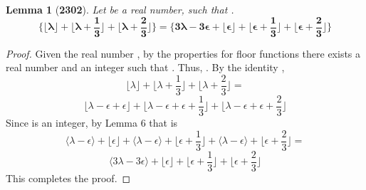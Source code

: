 \documentclass[preview]{standalone}
\newtheorem{lemma}{Lemma}
\begin{document}
\begin{lemma}[\textbf{2302}]
    Let \bm{$\lambda$} be a real number, 
    such that \bm{$\big \lfloor \lambda \big \rfloor + \epsilon = \lambda$}.
    \begin{equation*}
        \bm{
            \Bigg\{
                \bigg \lfloor \lambda \bigg \rfloor 
                    + 
                \bigg \lfloor \lambda + \frac{1}{3} \bigg \rfloor 
                    + 
                \bigg \lfloor \lambda + \frac{2}{3} \bigg \rfloor
            \Bigg\}
                =
            \Bigg\{
                3 \lambda - 3 \epsilon 
                    +
                \bigg \lfloor \epsilon \bigg \rfloor 
                    +
                \bigg \lfloor \epsilon + \frac{1}{3} \bigg \rfloor
                    +
                \bigg \lfloor \epsilon + \frac{2}{3} \bigg \rfloor            
            \Bigg\}
        }
    \end{equation*}
\end{lemma}

\begin{proof}
    Given the real number \bm{$\lambda$}, 
    by the properties for floor functions
    there exists a real number \bm{$\epsilon$}
    and an integer \bm{$\lambda - \epsilon$} such that 
    \bm{$\lfloor \lambda \rfloor = \lambda - \epsilon$}.
    Thus, \bm{$\lambda = \lambda - \epsilon + \epsilon$}.
    By the identity \bm{$\lambda$},
    \begin{equation*}
        \bigg \lfloor \lambda \bigg \rfloor 
            + 
        \bigg \lfloor \lambda + \frac{1}{3} \bigg \rfloor 
            + 
        \bigg \lfloor \lambda + \frac{2}{3} \bigg \rfloor
            =
    \end{equation*}
    \begin{equation*}
        \bigg \lfloor \lambda - \epsilon + \epsilon \bigg \rfloor 
            + 
        \bigg \lfloor \lambda - \epsilon + \epsilon + \frac{1}{3} \bigg \rfloor 
            + 
        \bigg \lfloor \lambda - \epsilon + \epsilon + \frac{2}{3} \bigg \rfloor
    \end{equation*}
    Since \bm{$\lambda - \epsilon$} is an integer, by Lemma 6 that is
    \begin{equation*}
        \bigg \langle \lambda - \epsilon \bigg \rangle + \bigg \lfloor \epsilon \bigg \rfloor 
            + 
        \bigg \langle \lambda - \epsilon \bigg \rangle + \bigg \lfloor \epsilon + \frac{1}{3} \bigg \rfloor 
            + 
        \bigg \langle \lambda - \epsilon \bigg \rangle + \bigg \lfloor \epsilon + \frac{2}{3} \bigg \rfloor
            =
    \end{equation*}
    \begin{equation*}
        \bigg \langle 3 \lambda - 3 \epsilon \bigg \rangle
            + 
        \bigg \lfloor \epsilon \bigg \rfloor 
            + 
        \bigg \lfloor \epsilon + \frac{1}{3} \bigg \rfloor 
            + 
        \bigg \lfloor \epsilon + \frac{2}{3} \bigg \rfloor
    \end{equation*}
    This completes the proof.
\end{proof}
\end{document}
